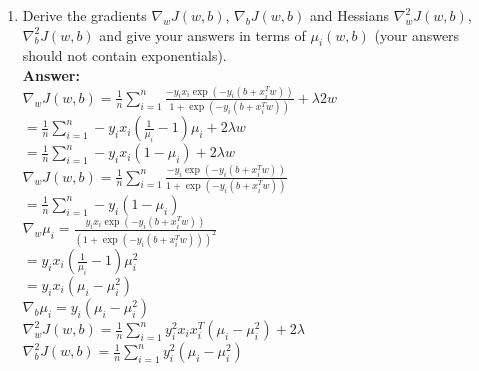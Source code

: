 \documentclass{article}
\newcommand{\1}{\mathbf{1}}
\begin{document}
\begin{enumerate}
  \item Derive the gradients $\nabla_w J(w,b)$, $\nabla_{b} J(w,b)$ and Hessians $\nabla_w^2 J(w,b)$, $\nabla_{b}^2 J(w,b)$ and give your answers in terms of $\mu_i(w,b)$ (your answers should not contain exponentials).\\
  
  \textbf{Answer:}\\
  $\nabla_w J(w,b)=\frac{1}{n} \sum_{i=1}^n \frac{-y_i x_i \exp(-y_i (b + x_i^T w))}{ 1 + \exp(-y_i (b + x_i^T w))} + \lambda 2 w$\\
  $=\frac{1}{n} \sum_{i=1}^n -y_i x_i (\frac{1}{\mu_i}-1) \mu_i  + 2\lambda w$\\
  $=\frac{1}{n} \sum_{i=1}^n -y_i x_i (1-\mu_i)  + 2\lambda w$\\
  
  $\nabla_w J(w,b)=\frac{1}{n} \sum_{i=1}^n \frac{-y_i \exp(-y_i (b + x_i^T w))}{ 1 + \exp(-y_i (b + x_i^T w))}$\\
  $=\frac{1}{n} \sum_{i=1}^n -y_i (1-\mu_i) $\\
  
  $\nabla_w \mu_i= \frac{y_i x_i\exp(-y_i (b + x_i^T w))}{(1+ \exp(-y_i (b + x_i^T w)))^2}$\\
 $ = y_i x_i (\frac{1}{\mu_i}-1) \mu_i^2$\\
 $ = y_i x_i (\mu_i- \mu_i^2)$\\
 
  $\nabla_b \mu_i= y_i  (\mu_i- \mu_i^2)$\\
  
  $\nabla_w^2 J(w,b)=\frac{1}{n} \sum_{i=1}^n y_i^2 x_i x_i^T (\mu_i- \mu_i^2)+2\lambda $\\
   $\nabla_b^2 J(w,b)=\frac{1}{n} \sum_{i=1}^n y_i^2 (\mu_i- \mu_i^2) $
  

\end{enumerate}
\end{document}
